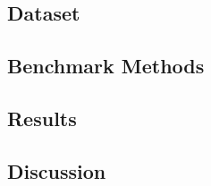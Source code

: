 \subsection{Dataset}
\label{sec:dataset}

\subsection{Benchmark Methods}
\label{sec:benchmark}

\subsection{Results}
\label{sec:res}

\subsection{Discussion}

